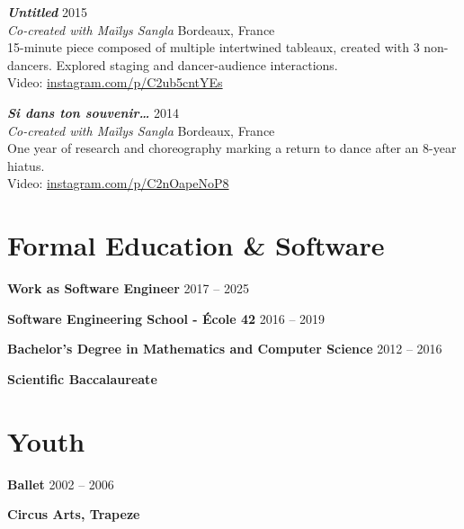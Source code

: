 \documentclass[10pt, a4paper]{article}
\begin{document}
\textbf{\textit{Untitled}} \hfill 2015 \\
\textit{Co-created with Maïlys Sangla} \hfill Bordeaux, France \\
15-minute piece composed of multiple intertwined tableaux, created with 3 non-dancers. Explored staging and dancer-audience interactions. \\
Video: \href{https://www.instagram.com/p/C2ub5cntYEs/}{instagram.com/p/C2ub5cntYEs}

\textbf{\textit{Si dans ton souvenir\ldots}} \hfill 2014 \\
\textit{Co-created with Maïlys Sangla} \hfill Bordeaux, France \\
One year of research and choreography marking a return to dance after an 8-year hiatus. \\
Video: \href{https://www.instagram.com/p/C2nOapeNoP8}{instagram.com/p/C2nOapeNoP8}

\section{Formal Education \& Software}

\textbf{Work as Software Engineer} \hfill 2017 -- 2025

\textbf{Software Engineering School - École 42} \hfill 2016 -- 2019

\textbf{Bachelor's Degree in Mathematics and Computer Science} \hfill 2012 -- 2016

\textbf{Scientific Baccalaureate}

\section{Youth}

\textbf{Ballet} \hfill 2002 -- 2006

\textbf{Circus Arts, Trapeze}
\end{document}
